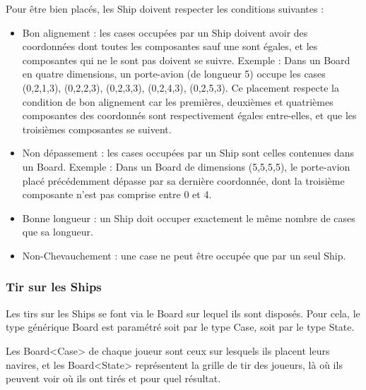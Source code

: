 	Pour être bien placés, les Ship doivent respecter les conditions suivantes :
	\begin{itemize}
		\item Bon alignement : les cases occupées par un Ship doivent avoir des coordonnées dont toutes les composantes sauf une sont égales, et les composantes qui ne le sont pas doivent se suivre. \newline
		Exemple : Dans un Board en quatre dimensions, un porte-avion (de longueur 5) occupe les cases (0,2,1,3), (0,2,2,3), (0,2,3,3), (0,2,4,3), (0,2,5,3). Ce placement respecte la condition de bon alignement car les premières, deuxièmes et quatrièmes composantes des coordonnés sont respectivement égales entre-elles, et que les troisièmes composantes se suivent. \newline
		
		\item Non dépassement : les cases occupées par un Ship sont celles contenues dans un Board. \newline
		Exemple : Dans un Board de dimensions (5,5,5,5), le porte-avion placé précédemment dépasse par sa dernière coordonnée, dont la troisième composante n'est pas comprise entre 0 et 4. \newline
		
		\item Bonne longueur : un Ship doit occuper exactement le même nombre de cases que sa longueur. \newline
		
		\item Non-Chevauchement : une case ne peut être occupée que par un seul Ship.
	\end{itemize}

\subsubsection{Tir sur les Ships}

	Les tirs sur les Ships se font via le Board sur lequel ils sont disposés. Pour cela, le type générique Board est paramétré soit par le type Case, soit par le type State. \newline
	
	Les Board<Case> de chaque joueur sont ceux sur lesquels ils placent leurs navires, et les Board<State> représentent la grille de tir des joueurs, là où ils peuvent voir où ils ont tirés et pour quel résultat. \newline
	
